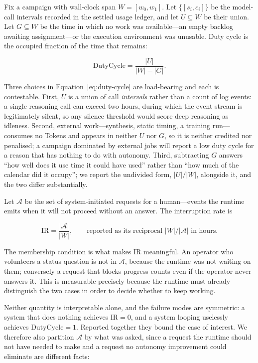Fix a campaign with wall-clock span $W=[w_0,w_1]$. Let $\{[s_i,c_i]\}$ be the
model-call intervals recorded in the settled usage ledger, and let $U\subseteq W$ be
their union. Let $G\subseteq W$ be the time in which no work was available---an empty
backlog awaiting assignment---or the execution environment was unusable. Duty cycle
is the occupied fraction of the time that remains:

\begin{equation}
  \mathrm{DutyCycle}=\frac{|U|}{|W|-|G|}.
  \label{eq:duty-cycle}
\end{equation}

Three choices in Equation~\ref{eq:duty-cycle} are load-bearing and each is
contestable. First, $U$ is a union of call \emph{intervals} rather than a count of
log events: a single reasoning call can exceed two hours, during which the event
stream is legitimately silent, so any silence threshold would score deep reasoning as
idleness. Second, external work---synthesis, static timing, a training run---consumes
no Tokens and appears in neither $U$ nor $G$, so it is neither credited nor
penalised; a campaign dominated by external jobs will report a low duty cycle for a
reason that has nothing to do with autonomy. Third, subtracting $G$ answers ``how
well does it use time it could have used'' rather than ``how much of the calendar did
it occupy''; we report the undivided form, $|U|/|W|$, alongside it, and the two
differ substantially.

Let $\mathcal{A}$ be the set of system-initiated requests for a human---events the
runtime emits when it will not proceed without an answer. The interruption rate is

\begin{equation}
  \mathrm{IR}=\frac{|\mathcal{A}|}{|W|},
  \qquad\text{reported as its reciprocal } |W|/|\mathcal{A}| \text{ in hours.}
  \label{eq:interruption-rate}
\end{equation}

The membership condition is what makes $\mathrm{IR}$ meaningful. An operator who
volunteers a status question is not in $\mathcal{A}$, because the runtime was not
waiting on them; conversely a request that blocks progress counts even if the
operator never answers it. This is measurable precisely because the runtime must
already distinguish the two cases in order to decide whether to keep working.

Neither quantity is interpretable alone, and the failure modes are symmetric: a
system that does nothing achieves $\mathrm{IR}=0$, and a system looping uselessly
achieves $\mathrm{DutyCycle}=1$. Reported together they bound the case of interest.
We therefore also partition $\mathcal{A}$ by what was asked, since a request the
runtime should not have needed to make and a request no autonomy improvement could
eliminate are different facts:

